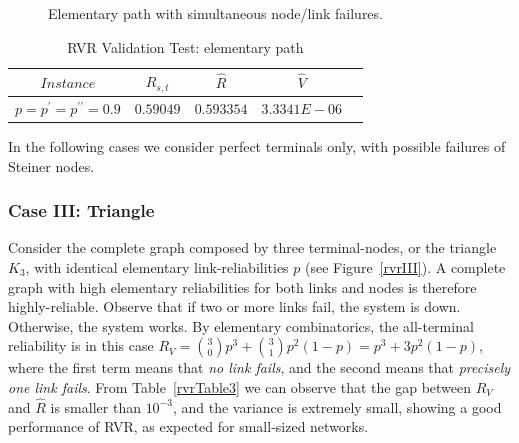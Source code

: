 \begin{figure}[H]
\begin{center}
\caption{Elementary path with simultaneous node/link failures. \label{rvrII}}
\end{center}
\end{figure}

\begin{table}[H]
\caption{RVR Validation Test: elementary path} %
\centering  %
\begin{tabular}{|c|c|c|c|c|} %
\hline	$Instance$   &	$R_{s,t}$ & $\hat{R}$&  $\hat{V}$ \\
\hline	$p=p^{\prime}=p^{\prime \prime}=0.9$	& $0.59049$ &	$0.593354$ 	&	$3.3341E-06$	\\
\hline
\end{tabular}
\label{rvrTable2} %
\end{table}

In the following cases we consider perfect terminals only, with possible failures of Steiner nodes. 
\subsubsection*{Case III: Triangle}
Consider the complete graph composed by three terminal-nodes, or the triangle $K_3$, 
with identical elementary link-reliabilities $p$ (see Figure~\ref{rvrIII}). 
A complete graph with high elementary reliabilities for both links and nodes is therefore highly-reliable. Observe that if two or more links fail, the system is down. 
Otherwise, the system works. By elementary combinatorics, the all-terminal reliability 
is in this case $R_V = \binom{3}{0}p^3+ \binom{3}{1}p^2(1-p) = p^3+3p^2(1-p)$, where the first term means that 
\emph{no link fails}, and the second means that \emph{precisely one link fails}. From Table~\ref{rvrTable3} 
we can observe that the gap between $R_{V}$ and $\hat{R}$ is smaller than $10^{-3}$, and the 
variance is extremely small, showing a good performance of RVR, as expected for small-sized networks. 

